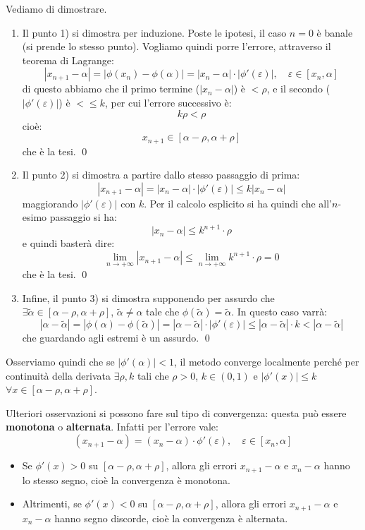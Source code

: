 \documentclass[a4paper,11pt]{article}
\begin{document}
Vediamo di dimostrare.
\begin{enumerate}
	\item Il punto 1) si dimostra per induzione.
		Poste le ipotesi, il caso $n = 0$ è banale (si prende lo stesso punto).
		Vogliamo quindi porre l'errore, attraverso il teorema di Lagrange:
		$$
		|x_{n + 1} - \alpha| = |\phi(x_n) - \phi(\alpha)| = |x_n - \alpha| \cdot |\phi'(\varepsilon)|, \quad \varepsilon \in [x_n, \alpha]
		$$
		di questo abbiamo che il primo termine ($|x_n - \alpha|$) è $< \rho$, e il secondo ($|\phi'(\varepsilon)|$) è $<\leq k$, per cui l'errore successivo è:
		$$
		k \rho < \rho
		$$
		cioè:
		$$
		x_{n + 1} \in [\alpha - \rho, \alpha + \rho]
		$$ 
		che è la tesi. \qed

	\item Il punto 2) si dimostra a partire dallo stesso passaggio di prima:
		$$
		|x_{n + 1} - \alpha| = |x_n - \alpha| \cdot |\phi'(\varepsilon)| \leq k |x_n - \alpha|
		$$
		maggiorando $|\phi'(\varepsilon)|$ con $k$.
		Per il calcolo esplicito si ha quindi che all'$n$-esimo passaggio si ha:
		$$
		|x_n - \alpha| \leq k^{n + 1} \cdot \rho 
		$$
		e quindi basterà dire:
		$$
		\lim_{n \rightarrow +\infty} |x_{n + 1} - \alpha| \leq \lim_{n \rightarrow  +\infty} k^{n + 1} \cdot \rho = 0 
		$$
		che è  la tesi. \qed

	\item Infine, il punto 3) si dimostra supponendo per assurdo che $\exists \tilde{\alpha} \in [\alpha - \rho, \alpha + \rho]$, $\tilde{\alpha} \neq \alpha$ tale che $\phi(\tilde{\alpha}) = \tilde{\alpha}$.
		In questo caso varrà:
		$$
		|\alpha - \tilde{\alpha}| = | \phi(\alpha) - \phi(\tilde{\alpha}) | = | \alpha - \tilde{\alpha}| \cdot | \phi'(\varepsilon) | \leq |\alpha - \tilde{\alpha} | \cdot k < | \alpha - \tilde{\alpha} |
		$$
		che guardando agli estremi è un assurdo. \qed
\end{enumerate}

Osserviamo quindi che se $|\phi'(\alpha)| < 1$, il metodo converge localmente perché per continuità della derivata $\exists \rho, k$ tali che $\rho > 0$, $k \in (0, 1)$ e $|\phi'(x)| \leq k$ $\forall x \in [\alpha - \rho, \alpha + \rho]$.

Ulteriori osservazioni si possono fare sul tipo di convergenza: questa può essere \textbf{monotona} o \textbf{alternata}.
Infatti per l'errore vale:
$$
(x_{n + 1} - \alpha) = (x_n - \alpha) \cdot \phi'(\varepsilon), \quad \varepsilon \in [x_n, \alpha]
$$

\begin{itemize}
	\item 
Se $\phi'(x) > 0$ su $[\alpha - \rho, \alpha + \rho]$, allora gli errori $x_{n + 1} - \alpha$ e $x_n - \alpha$ hanno lo stesso segno, cioè la convergenza è monotona.
	\item
		Altrimenti, se $\phi'(x) < 0$ su $[\alpha - \rho, \alpha + \rho]$, allora gli errori $x_{n + 1} - \alpha$ e $x_n - \alpha$ hanno segno discorde, cioè la convergenza è alternata.
\end{itemize}
\end{document}
